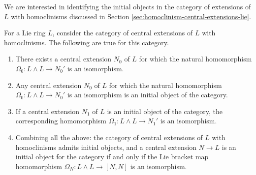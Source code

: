 \documentclass{ucetd}
\begin{document}
We are interested in identifying the initial objects in the category
of extensions of $L$ with homoclinisms discussed in Section
\ref{sec:homoclinism-central-extensions-lie}.

\begin{lemma}\label{lemma:initobj-lie}
  For a Lie ring $L$, consider the category of central extensions of $L$
  with homoclinisms. The following are true for this category.
  \begin{enumerate}
  \item There exists a central extension $N_0$ of $L$ for which the
    natural homomorphism $\Omega_0: L \wedge L \to N_0'$ is an isomorphism.
  \item Any central extension $N_0$ of $L$ for which the natural
    homomorphism $\Omega_0:L \wedge L \to N_0'$ is an isomorphism is
    an initial object of the category.
  \item If a central extension $N_1$ of $L$ is an initial object of
    the category, the corresponding homomorphism $\Omega_1:L \wedge L
    \to N_1'$ is an isomorphism.
  \item Combining all the above: the category of central extensions of
    $L$ with homoclinisms admits initial objects, and a central
    extension $N \to L$ is an initial object for the category if and
    only if the Lie bracket map homomorphism $\Omega_N: L \wedge L \to
    [N,N]$ is an isomorphism.
  \end{enumerate}
\end{lemma}
\end{document}
